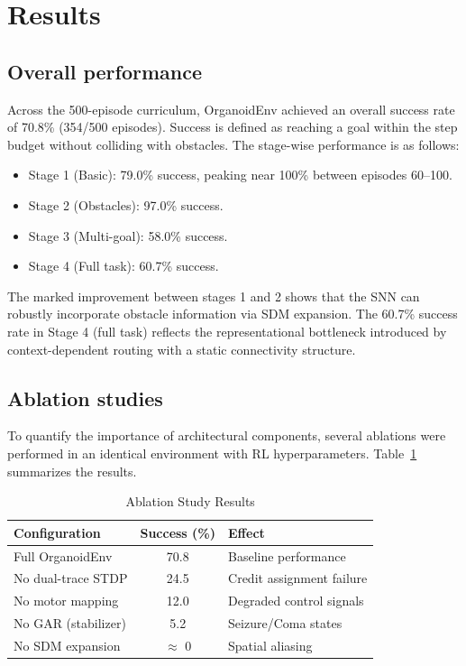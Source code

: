 \documentclass[journal]{IEEEtran}
\begin{document}
\section{Results}

\subsection{Overall performance}

Across the 500-episode curriculum, OrganoidEnv achieved an overall success rate of 70.8\% (354/500 episodes). 
Success is defined as reaching a goal within the step budget without colliding with obstacles. 
The stage-wise performance is as follows:
\begin{itemize}
    \item Stage 1 (Basic): 79.0\% success, peaking near 100\% between episodes 60--100.
    \item Stage 2 (Obstacles): 97.0\% success.
    \item Stage 3 (Multi-goal): 58.0\% success.
    \item Stage 4 (Full task): 60.7\% success.
\end{itemize}

The marked improvement between stages 1 and 2 shows that the SNN can robustly incorporate obstacle information via SDM expansion. 
The 60.7\% success rate in Stage 4 (full task) reflects the representational bottleneck introduced by context-dependent routing with a static connectivity structure.

\subsection{Ablation studies}

To quantify the importance of architectural components, several ablations were performed in an identical environment with RL hyperparameters. 
Table~\ref{table:ablation} summarizes the results.

\begin{table}[h]
\centering
\caption{Ablation Study Results}
\label{table:ablation}
\begin{tabular}{l c p{4cm}}
\hline
\textbf{Configuration} & \textbf{Success (\%)} & \textbf{Effect} \\ \hline
Full OrganoidEnv & 70.8 & Baseline performance \\
No dual-trace STDP & 24.5 & Credit assignment failure \\
No motor mapping & 12.0 & Degraded control signals \\
No GAR (stabilizer) & 5.2 & Seizure/Coma states \\
No SDM expansion & $\approx$ 0 & Spatial aliasing \\ \hline
\end{tabular}
\end{table}
\end{document}
